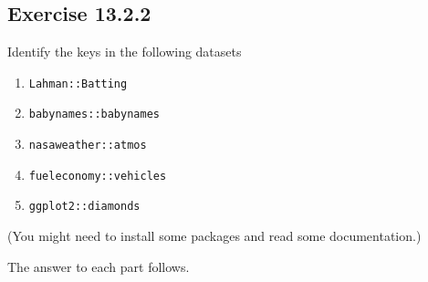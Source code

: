 \documentclass[]{book}
\providecommand{\tightlist}{%
  \setlength{\itemsep}{0pt}\setlength{\parskip}{0pt}}
\theoremstyle{plain}
\theoremstyle{remark}
\begin{document}
\hypertarget{exercise-13.2.2}{%
\subsection*{\texorpdfstring{Exercise
{13.2.2}}{Exercise 13.2.2}}\label{exercise-13.2.2}}

Identify the keys in the following datasets

\begin{enumerate}
\def\labelenumi{\arabic{enumi}.}
\tightlist
\item
  \texttt{Lahman::Batting}
\item
  \texttt{babynames::babynames}
\item
  \texttt{nasaweather::atmos}
\item
  \texttt{fueleconomy::vehicles}
\item
  \texttt{ggplot2::diamonds}
\end{enumerate}

(You might need to install some packages and read some documentation.)

The answer to each part follows.
\end{document}

